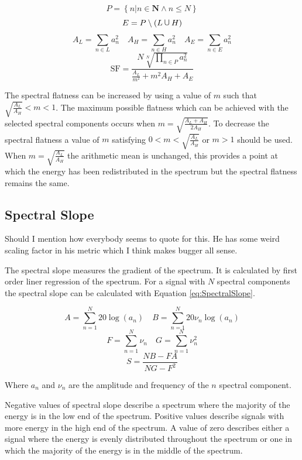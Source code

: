		\[ P = \left\{ n | n \in \textbf{N} \land n \leq N \right\} \]
		\[ E = P \setminus (L \medcup H) \]
		\[ A_{L} = \sum_{n \in L} a_{n}^{2} \quad A_{H} = \sum_{n \in H} a_{n}^{2}
		   \quad A_{E} = \sum_{n \in E} a_{n}^{2} \]
		\begin{equation}
			\textrm{SF} = \frac{N\sqrt[N]{\prod_{n \in P} a_{n}^{2}}}
			                   {\frac{A_{L}}{m^{2}} + m^{2}A_{H} + A_{E}}
		  	\label{eq:FlatnessManipulation}
		\end{equation}

		The spectral flatness can be increased by using a value of $m$ such that $\sqrt{\frac{A_{L}}{A_{H}}} < m <
		1$. The maximum possible flatness which can be achieved with the selected spectral components occurs when
		$m = \sqrt{\frac{A_{L} + A_{H}}{2A_{H}}}$. To decrease the spectral flatness a value of $m$ satisfying $0 <
		m < \sqrt{\frac{A_{L}}{A_{H}}}$ or $m > 1$ should be used. When $m = \sqrt{\frac{A_{L}}{A_{H}}}$ the
		arithmetic mean is unchanged, this provides a point at which the energy has been redistributed in the
		spectrum but the spectral flatness remains the same.

	\subsection{Spectral Slope}
	\label{sec:FetureControl-Parameterisation-Slope}
		\note
		{
			Should I mention how everybody seems to quote \citet{peeters2004a} for this. He has some weird
			scaling factor in his metric which I think makes bugger all sense.
		}

		The spectral slope measures the gradient of the spectrum. It is calculated by first order liner regression
		of the spectrum. For a signal with $N$ spectral components the spectral slope can be calculated with
		Equation \ref{eq:SpectralSlope}.

		\[ A = \sum_{n = 1}^{N} 20\log (a_{n}) \quad B = \sum_{n = 1}^{N} 20\nu_{n}\log (a_{n}) \]
		\[ F = \sum_{n = 1}^{N} \nu_{n} \quad G = \sum_{n = 1}^{N} \nu_{n}^{2} \]
		\begin{equation}
			S = \frac{NB - FA}
		                 {NG - F^{2}}
			\label{eq:SpectralSlope}
		\end{equation}

		Where $a_{n}$ and $\nu_{n}$ are the amplitude and frequency of the $n$ spectral component.

		Negative values of spectral slope describe a spectrum where the majority of the energy is in the low end of
		the spectrum. Positive values describe signals with more energy in the high end of the spectrum. A value of
		zero describes either a signal where the energy is evenly distributed throughout the spectrum or one in
		which the majority of the energy is in the middle of the spectrum.

